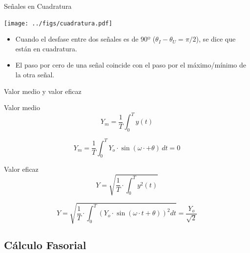 \documentclass[xcolor={usenames,svgnames,dvipsnames}]{beamer}
\begin{document}
\begin{frame}[label={sec:org546edfa}]{Señales en Cuadratura}
\begin{center}
\texttt{[image: ../figs/cuadratura.pdf]}
\end{center}

\begin{itemize}
\item Cuando el desfase entre dos señales es de 90º (\(\theta_I - \theta_U = \pi/2\)), se dice que están en cuadratura.
\item El paso por cero de una señal coincide con el paso por el máximo/mínimo de la otra señal.
\end{itemize}
\end{frame}


\begin{frame}[label={sec:org01c0cb4}]{Valor medio y valor eficaz}
\begin{block}{Valor medio}
\[
Y_m=\frac{1}{T}\int_{0}^{T}y(t)
\]

\[
Y_m=\frac{1}{T}\int_{0}^{T}Y_{o}\cdot\sin(\omega\cdot+\theta)\, dt=0
\]
\end{block}
\begin{block}{Valor eficaz}
\[
Y = \sqrt{\frac{1}{T}\cdot\int_{0}^{T}y^{2}(t)}
\]

\[
Y=\sqrt{\frac{1}{T}\cdot\int_{0}^{T}\left(Y_{o}\cdot\sin(\omega\cdot t+\theta)\right)^{2}dt}=\frac{Y_{o}}{\sqrt{2}}
\]
\end{block}
\end{frame}
\subsection{Cálculo Fasorial}
\label{sec:org1eab4f8}
\end{document}
